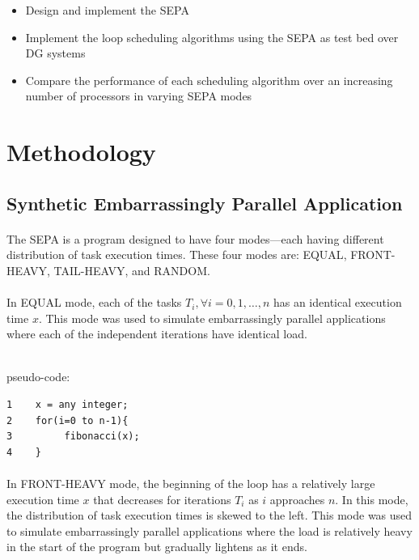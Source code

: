 \documentclass[10pt, twocolumn, letterpaper]{article}
\begin{document}
\begin{itemize}
	\item{Design and implement the SEPA}
	\item{Implement the loop scheduling algorithms using the SEPA as test bed over DG systems}
	\item{Compare the performance of each scheduling algorithm over an increasing number of processors in varying SEPA modes}
\end{itemize}

\section{Methodology}

\subsection{Synthetic Embarrassingly Parallel Application}

\paragraph{}
The SEPA is a program designed to have four modes---each having different distribution of task execution times. These four modes are: \textsf{EQUAL}, \textsf{FRONT-HEAVY}, \textsf{TAIL-HEAVY}, and \textsf{RANDOM}.

\paragraph{}
In \textsf{EQUAL} mode, each of the tasks $T_i, \forall i=0,1,\dots,n$ has an identical execution time $x$. This mode was used to simulate embarrassingly parallel applications where each of the independent iterations have identical load.

\textsf{\\pseudo-code:}
\begin{verbatim}
1    x = any integer;
2    for(i=0 to n-1){
3         fibonacci(x);
4    }
\end{verbatim}

\paragraph{}
In \textsf{FRONT-HEAVY} mode, the beginning of the loop has a relatively large execution time $x$ that decreases for iterations $T_i$ as $i$ approaches $n$. In this mode, the distribution of task execution times is skewed to the left. This mode was used to simulate embarrassingly parallel applications where the load is relatively heavy in the start of the program but gradually lightens as it ends. 
\end{document}
